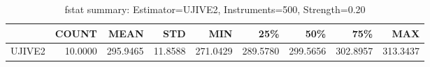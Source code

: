 \begin{table}[ht]
\centering
\caption{fstat summary: Estimator=UJIVE2, Instruments=500, Strength=0.20}
\begin{tabular}{lrrrrrrrr}
\toprule
 & COUNT & MEAN & STD & MIN & 25\% & 50\% & 75\% & MAX \\
\midrule
UJIVE2 & 10.0000 & 295.9465 & 11.8588 & 271.0429 & 289.5780 & 299.5656 & 302.8957 & 313.3437 \\
\bottomrule
\end{tabular}
\end{table}
